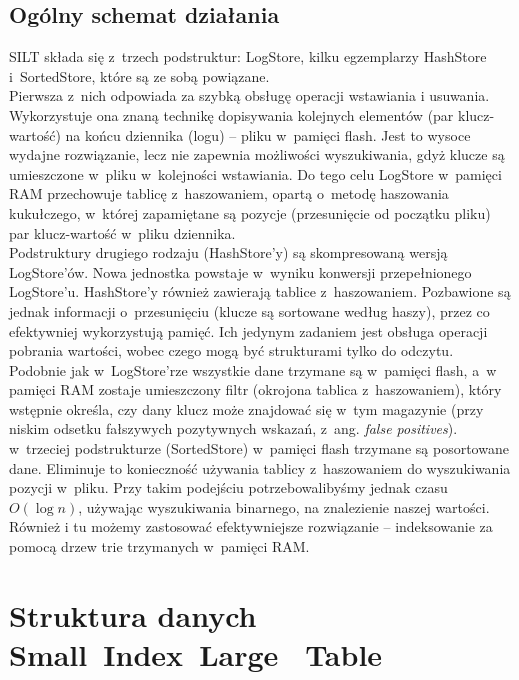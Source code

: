 \documentclass[declaration,shortabstract,masc]{iithesis}
\begin{document}
		\section{Ogólny schemat działania}
			SILT składa się z~trzech podstruktur: LogStore, kilku egzemplarzy HashStore i~SortedStore, które są ze sobą powiązane.\\
			\indent Pierwsza z~nich odpowiada za szybką obsługę operacji wstawiania i usuwania. Wykorzystuje ona znaną technikę dopisywania kolejnych elementów (par klucz-wartość) na końcu dziennika (logu) -- pliku w~pamięci flash. Jest to wysoce wydajne rozwiązanie, lecz nie zapewnia możliwości wyszukiwania, gdyż klucze są umieszczone w~pliku w~kolejności wstawiania. Do tego celu LogStore w~pamięci RAM przechowuje tablicę z~haszowaniem, opartą o~metodę haszowania kukułczego, w~której zapamiętane są pozycje (przesunięcie od początku pliku) par klucz-wartość w~pliku dziennika.\\
			\indent Podstruktury drugiego rodzaju (HashStore'y) są skompresowaną wersją LogStore'ów. Nowa jednostka powstaje w~wyniku konwersji przepełnionego LogStore'u. HashStore'y również zawierają tablice z~haszowaniem. Pozbawione są jednak informacji o~przesunięciu (klucze są sortowane według haszy), przez co efektywniej wykorzystują pamięć. Ich jedynym zadaniem jest obsługa operacji pobrania wartości, wobec czego mogą być strukturami tylko do odczytu. Podobnie jak w~LogStore'rze wszystkie dane trzymane są w~pamięci flash, a~w pamięci RAM zostaje umieszczony filtr (okrojona tablica z~haszowaniem), który wstępnie określa, czy dany klucz może znajdować się w~tym magazynie (przy niskim odsetku fałszywych pozytywnych wskazań, z~ang. \textit{false positives}).\\
			\indent w~trzeciej podstrukturze (SortedStore) w~pamięci flash trzymane są posortowane dane. Eliminuje to konieczność używania tablicy z~haszowaniem do wyszukiwania pozycji w~pliku. Przy takim podejściu potrzebowalibyśmy jednak czasu $O\left(\log n\right)$, używając wyszukiwania binarnego, na znalezienie naszej wartości. Również i tu możemy zastosować efektywniejsze rozwiązanie -- indeksowanie za pomocą drzew trie trzymanych w~pamięci RAM.
	\chapter{Struktura danych Small~Index~Large~	Table}
		\label{logstore}
\end{document}
